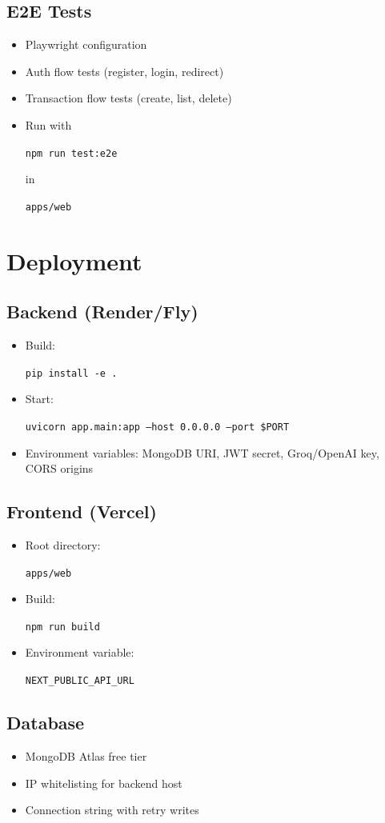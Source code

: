 \documentclass[11pt,a4paper]{article}
\newcommand{\code}[1]{\colorbox{codebg}{\strut\texttt{\small #1}}}
\begin{document}
\subsection{E2E Tests}
\begin{itemize}[leftmargin=*,itemsep=1pt]
  \item Playwright configuration
  \item Auth flow tests (register, login, redirect)
  \item Transaction flow tests (create, list, delete)
  \item Run with \code{npm run test:e2e} in \code{apps/web}
\end{itemize}

\section{Deployment}

\subsection{Backend (Render/Fly)}
\begin{itemize}[leftmargin=*,itemsep=1pt]
  \item Build: \code{pip install -e .}
  \item Start: \code{uvicorn app.main:app --host 0.0.0.0 --port \$PORT}
  \item Environment variables: MongoDB URI, JWT secret, Groq/OpenAI key, CORS origins
\end{itemize}

\subsection{Frontend (Vercel)}
\begin{itemize}[leftmargin=*,itemsep=1pt]
  \item Root directory: \code{apps/web}
  \item Build: \code{npm run build}
  \item Environment variable: \code{NEXT\_PUBLIC\_API\_URL}
\end{itemize}

\subsection{Database}
\begin{itemize}[leftmargin=*,itemsep=1pt]
  \item MongoDB Atlas free tier
  \item IP whitelisting for backend host
  \item Connection string with retry writes
\end{itemize}
\end{document}

